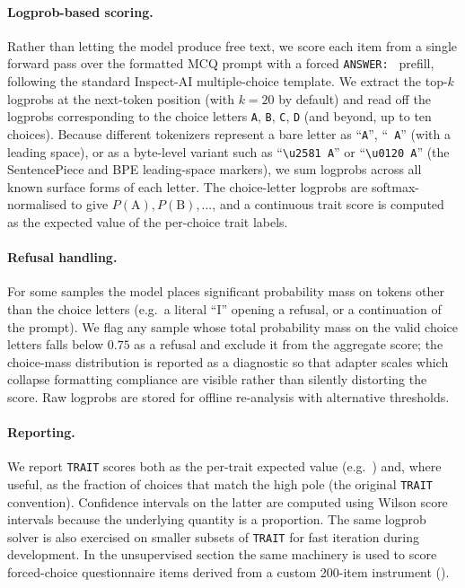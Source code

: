 \paragraph{Logprob-based scoring.}
Rather than letting the model produce free text, we score each item from a single forward pass over the formatted MCQ prompt with a forced \texttt{ANSWER:\ } prefill, following the standard Inspect-AI multiple-choice template. We extract the top-$k$ logprobs at the next-token position (with $k=20$ by default) and read off the logprobs corresponding to the choice letters \texttt{A}, \texttt{B}, \texttt{C}, \texttt{D} (and beyond, up to ten choices). Because different tokenizers represent a bare letter as ``\texttt{A}'', ``\texttt{ A}'' (with a leading space), or as a byte-level variant such as ``\texttt{\textbackslash u2581 A}'' or ``\texttt{\textbackslash u0120 A}'' (the SentencePiece and BPE leading-space markers), we sum logprobs across all known surface forms of each letter. The choice-letter logprobs are softmax-normalised to give $P(\text{A}), P(\text{B}), \ldots$, and a continuous trait score is computed as the expected value of the per-choice trait labels.

\paragraph{Refusal handling.}
For some samples the model places significant probability mass on tokens other than the choice letters (e.g.\ a literal ``I'' opening a refusal, or a continuation of the prompt). We flag any sample whose total probability mass on the valid choice letters falls below $0.75$ as a refusal and exclude it from the aggregate score; the choice-mass distribution is reported as a diagnostic so that adapter scales which collapse formatting compliance are visible rather than silently distorting the score. Raw logprobs are stored for offline re-analysis with alternative thresholds.

\paragraph{Reporting.}
We report \texttt{TRAIT} scores both as the per-trait expected value (e.g.\ ) and, where useful, as the fraction of choices that match the high pole (the original \texttt{TRAIT} convention). Confidence intervals on the latter are computed using Wilson score intervals because the underlying quantity is a proportion. The same logprob solver is also exercised on smaller subsets of \texttt{TRAIT} for fast iteration during development. In the unsupervised section the same machinery is used to score forced-choice questionnaire items derived from a custom 200-item instrument ().

